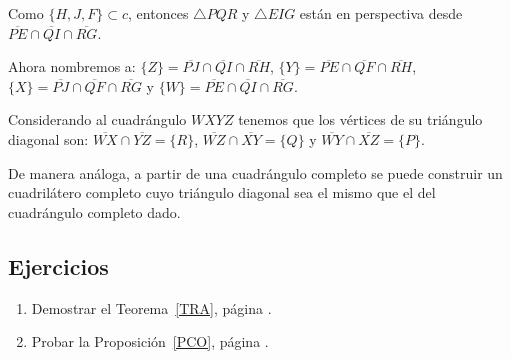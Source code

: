 Como $\{H,J,F\}\subset c$, entonces $\triangle PQR$ y $\triangle EIG$ están en perspectiva desde $\overline{PE}\cap\overline{QI}\cap\overline{RG}$.

Ahora nombremos a:
$\{Z\}=\overline{PJ}\cap\overline{QI}\cap\overline{RH}$,
$\{Y\}=\overline{PE}\cap\overline{QF}\cap\overline{RH}$,
$\{X\}=\overline{PJ}\cap\overline{QF}\cap\overline{RG}$ y 
$\{W\}=\overline{PE}\cap\overline{QI}\cap\overline{RG}$. 

Considerando al cuadrángulo $WXYZ$ tenemos que los vértices de su triángulo diagonal son:
$\overline{WX}\cap\overline{YZ}=\{R\}$, $\overline{WZ}\cap\overline{XY}=\{Q\}$ y $\overline{WY}\cap\overline{XZ}=\{P\}$.

De manera análoga, a partir de una cuadrángulo completo se puede construir un cuadrilátero completo cuyo triángulo diagonal sea el mismo que el del cuadrángulo completo dado. 

\subsection*{Ejercicios}
\begin{enumerate}
\item Demostrar el Teorema~\ref{TRA}, página \pageref{TRA}. \label{ETRA}
\item Probar la Proposición~\ref{PCO}, página \pageref{PCO}. \label{EPCO}
\end{enumerate}


